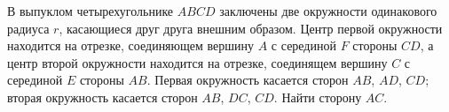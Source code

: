\documentclass[preview]{standalone}
\begin{document}
В выпуклом четырехугольнике $ABCD$ заключены две окружности одинакового радиуса $r$, 
                          касающиеся друг друга внешним образом. Центр первой окружности находится на отрезке, 
                          соединяющем вершину $A$ с серединой $F$ стороны $CD$, а центр второй окружности находится 
                          на отрезке, соединящем вершину $C$ с серединой $E$ стороны $AB$. Первая окружность касается 
                          сторон $AB$, $AD$, $CD$; вторая окружность касается сторон $AB$, $DC$, $CD$. Найти сторону $AC$.
\end{document}
